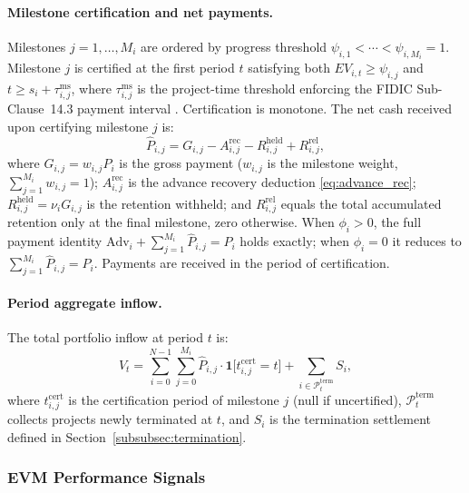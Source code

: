 \paragraph{Milestone certification and net payments.}
Milestones $j = 1, \ldots, M_i$ are ordered by progress threshold
$\psi_{i,1} < \cdots < \psi_{i,M_i} = 1$. Milestone $j$ is certified
at the first period $t$ satisfying both
$EV_{i,t} \geq \psi_{i,j}$ and $t \geq s_i + \tau^{\mathrm{ms}}_{i,j}$,
where $\tau^{\mathrm{ms}}_{i,j}$ is the project-time threshold
enforcing the FIDIC Sub-Clause~14.3 payment interval
\citep{FIDIC2017}. Certification is monotone. The net cash received
upon certifying milestone $j$ is:
\begin{equation}
  \hat{P}_{i,j}
    = G_{i,j}
      - A^{\mathrm{rec}}_{i,j}
      - R^{\mathrm{held}}_{i,j}
      + R^{\mathrm{rel}}_{i,j},
  \label{eq:net_payment}
\end{equation}
where $G_{i,j} = w_{i,j} P_i$ is the gross payment ($w_{i,j}$ is the
milestone weight, $\sum_{j=1}^{M_i} w_{i,j} = 1$);
$A^{\mathrm{rec}}_{i,j}$ is the advance recovery deduction
\eqref{eq:advance_rec};
$R^{\mathrm{held}}_{i,j} = \nu_i G_{i,j}$ is the retention withheld;
and $R^{\mathrm{rel}}_{i,j}$ equals the total accumulated retention
only at the final milestone, zero otherwise. When $\phi_i > 0$, the
full payment identity
$\mathrm{Adv}_i + \sum_{j=1}^{M_i} \hat{P}_{i,j} = P_i$ holds
exactly; when $\phi_i = 0$ it reduces to
$\sum_{j=1}^{M_i} \hat{P}_{i,j} = P_i$.
Payments are received in the period of certification.

\paragraph{Period aggregate inflow.}
The total portfolio inflow at period $t$ is:
\begin{equation}
  V_t
    = \sum_{i=0}^{N-1} \sum_{j=0}^{M_i}
        \hat{P}_{i,j} \cdot
        \mathbf{1}\!\bigl[t^{\mathrm{cert}}_{i,j} = t\bigr]
      + \sum_{i \in \mathcal{P}_t^{\mathrm{term}}} S_i,
  \label{eq:Vt}
\end{equation}
where $t^{\mathrm{cert}}_{i,j}$ is the certification period of
milestone $j$ (null if uncertified), $\mathcal{P}_t^{\mathrm{term}}$
collects projects newly terminated at $t$, and $S_i$ is the
termination settlement defined in Section~\ref{subsubsec:termination}.

\subsubsection{EVM Performance Signals}
\label{subsubsec:evm}

